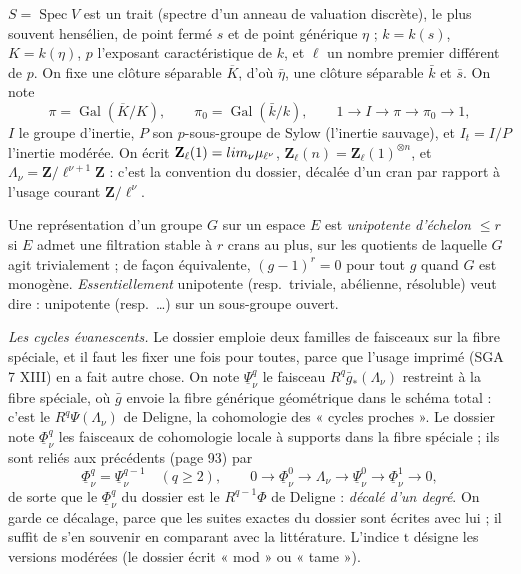 \documentclass[11pt,a4paper]{article}
\begin{document}
$S = \operatorname{Spec} V$ est un trait (spectre d'un anneau de valuation
discrète), le plus souvent hensélien, de point fermé $s$ et de point générique
$\eta$ ; $k = k(s)$, $K = k(\eta)$, $p$ l'exposant caractéristique de $k$, et
$\ell$ un nombre premier différent de $p$. On fixe une clôture séparable
$\overline K$, d'où $\bar\eta$, une clôture séparable $\bar k$ et $\bar s$. On
note
\[
  \pi = \operatorname{Gal}(\overline K / K), \qquad
  \pi_0 = \operatorname{Gal}(\bar k / k), \qquad
  1 \to I \to \pi \to \pi_0 \to 1 ,
\]
$I$ le groupe d'inertie, $P$ son $p$-sous-groupe de Sylow (l'inertie sauvage),
et $I_t = I/P$ l'inertie modérée. On écrit $\mathbf{Z}_\ell(1) = \varprojlim_\nu
\mu_{\ell^\nu}$, $\mathbf{Z}_\ell(n) = \mathbf{Z}_\ell(1)^{\otimes n}$, et
$\Lambda_\nu = \mathbf{Z}/\ell^{\nu+1}\mathbf{Z}$ : c'est la convention du
dossier, décalée d'un cran par rapport à l'usage courant $\mathbf{Z}/\ell^\nu$.

Une représentation d'un groupe $G$ sur un espace $E$ est \emph{unipotente
d'échelon $\leq r$} si $E$ admet une filtration stable à $r$ crans au plus, sur
les quotients de laquelle $G$ agit trivialement ; de façon équivalente,
$(g-1)^r = 0$ pour tout $g$ quand $G$ est monogène. \emph{Essentiellement}
unipotente (resp.\ triviale, abélienne, résoluble) veut dire : unipotente
(resp.\ \ldots) sur un sous-groupe ouvert.

\emph{Les cycles évanescents.} Le dossier emploie deux familles de faisceaux
sur la fibre spéciale, et il faut les fixer une fois pour toutes, parce que
l'usage imprimé (SGA 7 XIII) en a fait autre chose. On note
$\underline\Psi^q_\nu$ le faisceau $R^q \bar g_* (\Lambda_\nu)$ restreint à la
fibre spéciale, où $\bar g$ envoie la fibre générique géométrique dans le
schéma total : c'est le $R^q\Psi(\Lambda_\nu)$ de Deligne, la
cohomologie des « cycles proches ». Le dossier note $\underline\Phi^q_\nu$ les
faisceaux de cohomologie locale à supports dans la fibre spéciale ; ils sont
reliés aux précédents (page 93) par
\[
  \underline\Phi^q_\nu = \underline\Psi^{q-1}_\nu \quad (q \geq 2), \qquad
  0 \to \underline\Phi^0_\nu \to \Lambda_\nu \to \underline\Psi^0_\nu \to
  \underline\Phi^1_\nu \to 0 ,
\]
de sorte que le $\underline\Phi^q_\nu$ du dossier est le $R^{q-1}\Phi$ de
Deligne : \emph{décalé d'un degré}. On garde ce décalage, parce que les suites
exactes du dossier sont écrites avec lui ; il suffit de s'en souvenir en
comparant avec la littérature. L'indice $\mathrm{t}$ désigne les versions
modérées (le dossier écrit « mod » ou « tame »).
\end{document}
